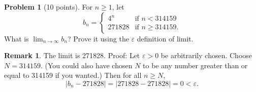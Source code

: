 \documentclass[11pt,oneside]{amsart}
\theoremstyle{definition}
\newtheorem{problem}{Problem}
\newtheorem*{remark}{Remark}
\newcommand{\eps}{\varepsilon}
\begin{document}
\newpage

\begin{problem}[10 points]
For $n\geq 1$, let
\[b_n=\begin{cases}
    4^n    & \text{if }n<314159      \\
    271828 & \text{if }n\geq 314159.
  \end{cases}\]
What is $\lim_{n\to\infty}b_n$? Prove it using the $\eps$ definition of limit.
\end{problem}
\begin{remark}
  The limit is 271828. Proof: Let $\eps>0$ be arbitrarily chosen. Choose $N=314159$. (You could also have chosen $N$ to be any number greater than or equal to 314159 if you wanted.) Then for all $n\geq N$,
  \[|b_n-271828|=|271828-271828|=0<\eps.\]
\end{remark}
\end{document}
